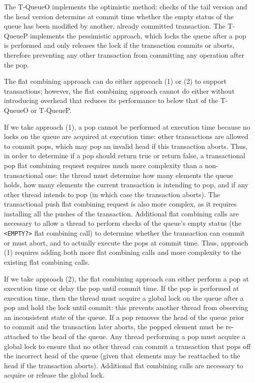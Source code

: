 The T-QueueO implements the optimistic method: checks of the tail version and the head version determine at commit time whether the empty status of the queue has been modified by another, already committed transaction. The T-QueueP implements the pessimistic approach, which locks the queue after a pop is performed and only releases the lock if the transaction commits or aborts, therefore preventing any other transaction from committing any operation after the pop.

The flat combining approach can do either approach (1) or (2) to support transactions; however, the flat combining approach cannot do either without introducing overhead that reduces its performance to below that of the T-QueueO or T-QueueP.

If we take approach (1), a pop cannot be performed at execution time because no locks on the queue are acquired at execution time: other transactions are allowed to commit pops, which may pop an invalid head if this transaction aborts. Thus, in order to determine if a pop should return true or return false, a transactional pop flat combining request requires much more complexity than a non-transactional one: the thread must determine how many elements the queue holds, how many elements the current transaction is intending to pop, and if any other thread intends to pop (in which case the transaction aborts). The transactional push flat combining request is also more complex, as it requires installing all the pushes of the transaction. Additional flat combining calls are necessary to allow a thread to perform checks of the queue's empty status (the \texttt{<EMPTY?>} flat combining call) to determine whether the transaction can commit or must abort, and to actually execute the pops at commit time. Thus, approach (1) requires adding both more flat combining calls and more complexity to the existing flat combining calls.

If we take approach (2), the flat combining approach can either perform a pop at execution time or delay the pop until commit time. If the pop is performed at execution time, then the thread must acquire a global lock on the queue after a pop and hold the lock until commit: this prevents another thread from observing an inconsistent state of the queue. If a pop removes the head of the queue prior to commit and the transaction later aborts, the popped element must be re-attached to the head of the queue. Any thread performing a pop must acquire a global lock to ensure that no other thread can commit a transaction that pops off the incorrect head of the queue (given that elements may be reattached to the head if the transaction aborts). Additional flat combining calls are necessary to acquire or release the global lock. 

